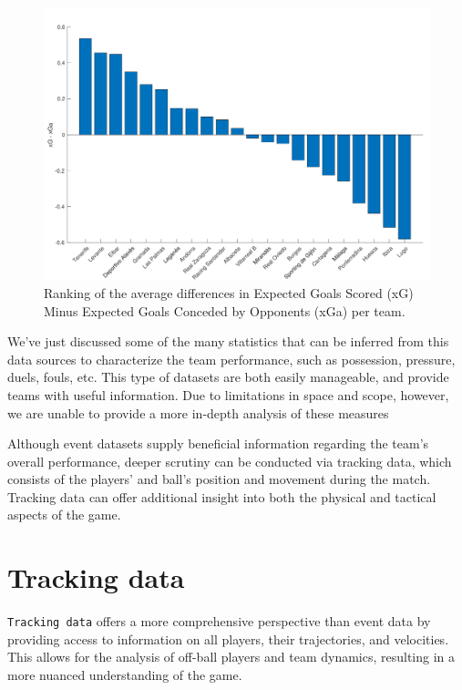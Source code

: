 \documentclass[
  twoside,nohyper]{book}
\begin{document}
\begin{figure}[H]

{\centering \includegraphics[width=0.8\linewidth,]{imagenes/xG-xGa} 

}

\caption{Ranking of the average differences in Expected Goals Scored (xG) Minus Expected Goals Conceded by Opponents (xGa) per team.}\label{fig:rank-xg-xga}
\end{figure}

We've just discussed some of the many statistics that can be inferred from this data sources to characterize the team performance, such as possession, pressure, duels, fouls, etc. This type of datasets are both easily manageable, and provide teams with useful information. Due to limitations in space and scope, however, we are unable to provide a more in-depth analysis of these measures

Although event datasets supply beneficial information regarding the team's overall performance, deeper scrutiny can be conducted via tracking data, which consists of the players' and ball's position and movement during the match. Tracking data can offer additional insight into both the physical and tactical aspects of the game.

\section{Tracking data}\label{tracking-data}

\texttt{Tracking\ data} offers a more comprehensive perspective than event data by providing access to information on all players, their trajectories, and velocities. This allows for the analysis of off-ball players and team dynamics, resulting in a more nuanced understanding of the game.
\end{document}

